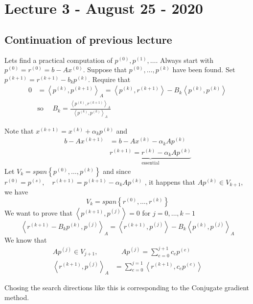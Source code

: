 \documentclass{article}
\theoremstyle{remark}
\begin{document}
\newpage
\section{Lecture 3 -  August 25 - 2020}%
\label{sec:lecture_3}

\subsection{Continuation of previous lecture}%
\label{sub:contiouation_of_previous_lecture}


 Lets find a practical computation of $p^{(0)}, p^{(1)}, \ldots$. Always start with $p^{(0)} = r^{(0)} = b -Ax^{(0)}$. Suppose that $p^{(0)}, \ldots , p^{(k)}$ have been found. Set $p^{(k+1)} = r^{(k+1)} - b_{k} p ^{(k)}$. Require that \[
   \begin{split}
 0 &=   \left<p^{(k)} , p^{(k+1)} \right> _{A} = \left< p^{(k)}, r^{(k+1)}   \right> - B_{k} \left<p^{(k)} , p^{(k)} \right> \\
   &  \text{so } \quad  B_{k} =  \frac{\left<p^{(k)} , r^{(k+1)} \right> _{A}}{ \left<p^{(k)} , p^{(k)} \right>_{A}}     
   \end{split} 
 \] 

 Note that $x^{(k+1)} = x^{(k)} + \alpha _{k} p^{(k)} $  and \[
   \begin{split}
 b -Ax^{(k+1)} &=   b - Ax^{(k)} - \alpha _{k} Ap^{(k)} \\
  &  \underbrace{r^{(k+1)} =   r^{(k)} - \alpha  _{k} Ap^{(k)}}_\text{essential} 
   \end{split} 
 \] 
 Let $V_{k} = span \left\{ p^{(0)} , \ldots, p^{(k)} \right\}$ and since $r^{(0)} = p^{(s)}, \quad r^{(k+1)} = p ^{(k+1)} - \alpha _{k} A p^{(k)}   $ , it happens that $Ap^{(k)} \in  V_{k+1}$, we have \[
   V_{k} = span \left\{ r^{(0)} , \ldots, r^{(k)} \right\}
 \] 
 We want to prove that $\left<p^{(k+1)} , p^{(j)} \right> = 0 $ for $j = 0, \ldots, k-1$ \[
   \left<r^{(k+1)}- B_{k} p^{(k)} , p^{(j)} \right> _{A} = \left<r^{(k+1)}, p^{(j)} \right> - B_{k}\left< p^{(k)} , p^{(j)} \right>_{A}
 \] 
 We know that \[
   \begin{split}
 Ap^{(j)} \in  V_{j+1} , &  \quad  A p^{(j)} = \sum_{e=0}^{j +1}  c_{e} p^{(e)}  \\
 \left<r^{(k+1)} , p^{(j)}  \right> _{A} &=  \sum_{e = 0}^{ j=1 }  \left<r^{(k+1)}, c_{e}p^{(e)} \right> 
   \end{split} 
 \] 

 Chosing the search directions like this is corresponding to the Conjugate gradient method. 
\end{document}
